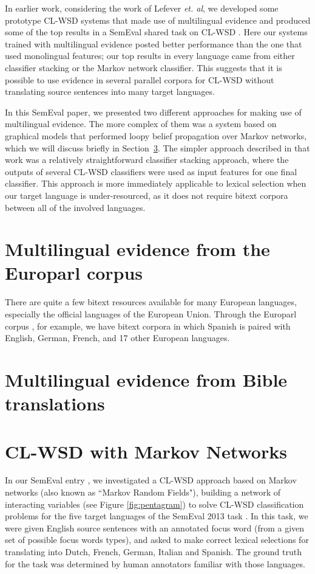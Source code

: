 In earlier work, considering the work of Lefever \emph{et. al}, we developed
some prototype CL-WSD systems that made use of multilingual evidence
\cite{rudnick-liu-gasser:2013:SemEval-2013} and produced some of the top
results in a SemEval shared task on CL-WSD \cite{task10}.
Here our systems trained with multilingual evidence posted better performance
than the one that used monolingual features; our top results in every language
came from either classifier stacking or the Markov network classifier. This
suggests that it is possible to use evidence in several parallel corpora for
CL-WSD without translating source sentences into many target languages.

In this SemEval paper, we presented two different approaches for making use of
multilingual evidence. The more complex of them was a system based on graphical
models that performed loopy belief propagation over Markov networks, which we
will discuss briefly in Section~\ref{sec:multilingual-mrf}. The simpler
approach described in that work was a relatively straightforward classifier
stacking approach, where the outputs of several CL-WSD classifiers were used as
input features for one final classifier. This approach is more immediately
applicable to lexical selection when our target language is under-resourced, as
it does not require bitext corpora between all of the involved languages.

\section{Multilingual evidence from the Europarl corpus} 
There are quite a few bitext resources available for many European languages,
especially the official languages of the European Union.
Through the Europarl corpus \cite{europarl}, for example, we have bitext
corpora in which Spanish is paired with English, German, French, and 17 other
European languages.


\section{Multilingual evidence from Bible translations}

\section{CL-WSD with Markov Networks}
\label{sec:multilingual-mrf}
In our SemEval entry \cite{rudnick-liu-gasser:2013:SemEval-2013}, we
investigated a CL-WSD approach based on Markov networks (also known as ``Markov
Random Fields"), building a network of interacting variables (see Figure
\ref{fig:pentagram}) to solve CL-WSD classification problems for the five
target languages of the SemEval 2013 task \cite{task10}. In this task, we were
given English source sentences with an annotated focus word (from a given set
of possible focus words types), and asked to make correct lexical selections
for translating into Dutch, French, German, Italian and Spanish. The ground
truth for the task was determined by human annotators familiar with those
languages.

